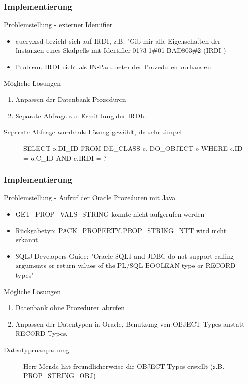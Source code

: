 \documentclass[serif,mathserif]{beamer}
\begin{document}
\begin{frame}
  \frametitle{Implementierung}
  Problemstellung - externer Identifier 
  \begin{itemize}
  \item query.xsd bezieht sich auf IRDI, z.B. "Gib mir alle Eigenschaften der Instanzen eines Skalpells mit Identifier 0173-1\#01-BAD803\#2  (IRDI )
  \item Problem: IRDI nicht als IN-Parameter der Prozeduren vorhanden
  \end{itemize}
  
  Mögliche Lösungen
   \begin{enumerate}
  \item Anpassen der Datenbank Prozeduren
  \item Separate Abfrage zur Ermittlung der IRDIs
  \end{enumerate}
  
  \begin{description}
\item[Separate Abfrage wurde als Lösung gewählt, da sehr simpel] SELECT o.DI\_ID FROM DE\_CLASS c, DO\_OBJECT o WHERE c.ID = o.C\_ID AND c.IRDI = ? 
\end{description}

\end{frame}


\begin{frame}
  \frametitle{Implementierung}
  Problemstellung - Aufruf der Oracle Prozeduren mit Java
  \begin{itemize}
  \item GET\_PROP\_VALS\_STRING konnte nicht aufgerufen werden
  \item Rückgabetyp: PACK\_PROPERTY.PROP\_STRING\_NTT wird nicht erkannt
  \item SQLJ Developers Guide: "Oracle SQLJ and JDBC do not support calling arguments or return values of the PL/SQL BOOLEAN type or RECORD types"
  \end{itemize}
  
  Mögliche Lösungen
   \begin{enumerate}
  \item Datenbank ohne Prozeduren abrufen
  \item Anpassen der Datentypen in Oracle, Benutzung von OBJECT-Types anstatt RECORD-Types.
  \end{enumerate}
  
  \begin{description}
\item[Datentypenanpassung] Herr Mende hat freundlicherweise die OBJECT Types erstellt (z.B. PROP\_STRING\_OBJ)
\end{description}

\end{frame}
\end{document}
